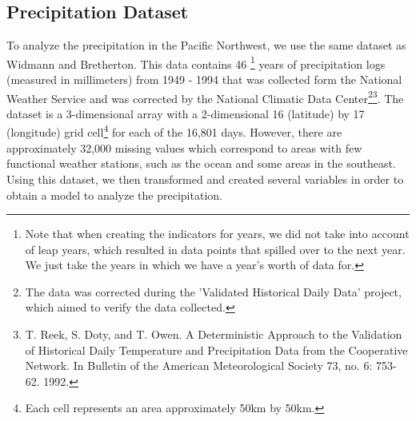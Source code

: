 \documentclass{article}
\begin{document}
\subsection{Precipitation Dataset}
To analyze the precipitation in the Pacific Northwest, we use the same dataset as Widmann and Bretherton. This data contains 46 \footnote{Note that when creating the indicators for years, we did not take into account of leap years, which resulted in data points that spilled over to the next year. We just take the years in which we have a year's worth of data for.} years of precipitation logs (measured in millimeters) from 1949 - 1994 that was collected form the National Weather Service and was corrected by the National Climatic Data Center\footnote{The data was corrected during the 'Validated Historical Daily Data' project, which aimed to verify the data collected.}\footnote{T. Reek, S. Doty, and T. Owen. A Deterministic Approach to the Validation of Historical Daily Temperature and Precipitation Data from the Cooperative Network. In Bulletin of the American Meteorological Society 73, no. 6: 753-62. 1992.}. The dataset is a 3-dimensional array with a 2-dimensional 16 (latitude) by 17 (longitude) grid cell\footnote{Each cell represents an area approximately 50km by 50km.} for each of the 16,801 days. However, there are approximately 32,000 missing values which correspond to areas with few functional weather stations, such as the ocean and some areas in the southeast. Using this dataset, we then transformed and created several variables in order to obtain a model to analyze the precipitation. 
\end{document}
